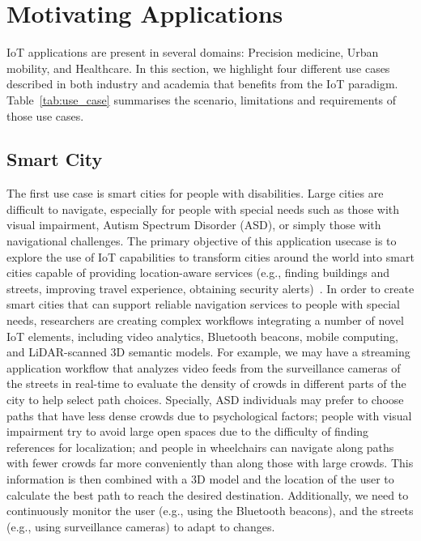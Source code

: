 \section{Motivating Applications}\label{sec:usecases} 
IoT applications are present in several domains: Precision medicine, Urban mobility, and Healthcare.
In this section, we highlight four different use cases described in both industry and academia that benefits from the IoT paradigm. 
Table~\ref{tab:use_case} summarises the scenario, limitations and requirements of those use cases.


\subsection{Smart City}

The first use case is smart cities for people with disabilities. Large cities are difficult to navigate, especially for people with special needs such as those with visual impairment, Autism Spectrum Disorder (ASD), or simply those with navigational challenges. The primary objective of this application usecase is to explore the use of IoT capabilities to transform cities around the world into smart cities capable of providing location-aware services (e.g., finding buildings and streets, improving travel experience, obtaining security alerts)~\cite{smarHubJie}. In order to create smart cities that can support reliable navigation services to people with special needs, researchers are creating complex workflows integrating a number of novel IoT elements, including video analytics, Bluetooth beacons, mobile computing, and LiDAR-scanned 3D semantic models. For example, we may have a streaming application workflow that analyzes video feeds from the surveillance cameras of the streets in real-time to evaluate the density of crowds in different parts of the city to help select path choices. Specially, ASD individuals may prefer to choose paths that have less dense crowds due to psychological factors; people with visual impairment try to avoid large open spaces due to the difficulty of finding references for localization; and people in wheelchairs can navigate along paths with fewer crowds far more conveniently than along those with large crowds. This information is then combined with  a 3D model and the location of the user to calculate the best path to reach the desired destination. Additionally, we need to continuously monitor the user (e.g., using the Bluetooth beacons), and the streets (e.g., using surveillance cameras) to adapt to changes.

